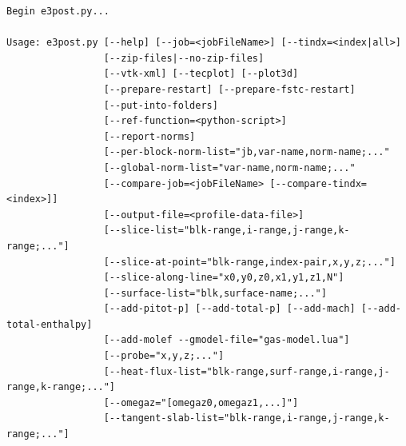 \noindent
{\footnotesize
\begin{verbatim}
Begin e3post.py...

Usage: e3post.py [--help] [--job=<jobFileName>] [--tindx=<index|all>]
                 [--zip-files|--no-zip-files]
                 [--vtk-xml] [--tecplot] [--plot3d]
                 [--prepare-restart] [--prepare-fstc-restart]
                 [--put-into-folders]
                 [--ref-function=<python-script>]
                 [--report-norms]
                 [--per-block-norm-list="jb,var-name,norm-name;..."
                 [--global-norm-list="var-name,norm-name;..."
                 [--compare-job=<jobFileName> [--compare-tindx=<index>]]
                 [--output-file=<profile-data-file>]
                 [--slice-list="blk-range,i-range,j-range,k-range;..."]
                 [--slice-at-point="blk-range,index-pair,x,y,z;..."]
                 [--slice-along-line="x0,y0,z0,x1,y1,z1,N"]
                 [--surface-list="blk,surface-name;..."]
                 [--add-pitot-p] [--add-total-p] [--add-mach] [--add-total-enthalpy]
                 [--add-molef --gmodel-file="gas-model.lua"]
                 [--probe="x,y,z;..."]
                 [--heat-flux-list="blk-range,surf-range,i-range,j-range,k-range;..."]
                 [--omegaz="[omegaz0,omegaz1,...]"]
                 [--tangent-slab-list="blk-range,i-range,j-range,k-range;..."]
\end{verbatim}
} %

